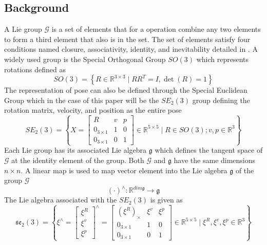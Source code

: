 \subsection{Background}
A Lie group $\mathcal{G}$ is a set of elements that for a operation combine any two elements to form a third element that also is in the set. The set of elements satisfy four conditions named closure, associativity, identity, and inevitability detailed in \cite{book}. A widely used group is the Special Orthogonal Group $SO(3)$ which represents rotations defined as \cite{book}
\begin{equation}
    SO(3)=\left\{R \in \mathbb{R}^{3 \times 3} \mid R R^T=I, \operatorname{det} (R)=1\right\}
    \label{eq: SO3 group}
\end{equation}
The representation of pose can also be defined through the Special Euclidean Group which in the case of this paper will be the $SE_2(3)$ group defining the rotation matrix, velocity, and position as the entire pose
\begin{equation}
    SE_2(3) = \left\{X = \begin{bmatrix}
    R & v & p\\
    0_{3 \times 1} & 1 & 0\\
    0_{3 \times 1} & 0 & 1
    \end{bmatrix} \in \mathbb{R}^{5 \times 5}
    \mid R \in SO(3); v, p \in \mathbb{R}^3\right\}
    \label{eq: SE3_2 group}
\end{equation}
Each Lie group has its associated Lie algebra $\mathfrak{g}$ which defines the tangent space of $\mathcal{G}$ at the identity element of the group. Both $\mathcal{G}$ and $\mathfrak{g}$ have the same dimensions $n \times n$. A linear map is used to map vector element into the Lie algebra $\mathfrak{g}$ of the group $\mathcal{G}$ \cite{Contact-Aided_Invarant_EKF}
\begin{equation}
    (\cdot)^{\wedge}: \mathbb{R}^{dim \mathfrak{g}} \rightarrow \mathfrak{g}
    \label{eq: linear map to g}
\end{equation}
The Lie algebra associated with the $SE_2(3)$ is given as 
\begin{equation}
    \mathfrak{s e}_2(3) =\left\{\xi^{\wedge} = 
    \begin{bmatrix}
         \xi^R \\
         \xi^v \\
         \xi^p
    \end{bmatrix}^{\wedge}
        =\begin{bmatrix}
    (\xi^R)_{\times} & \xi^v & \xi^p\\
    0_{3 \times 1} & 1 & 0\\
    0_{3 \times 1}  & 0 & 1
    \end{bmatrix} \in \mathbb{R}^{5 \times 5}
    \mid \xi^R, \xi^v, \xi^p \in \mathbb{R}^3\right\}
    \label{eq: se_2(3) lie algebra}
\end{equation}
